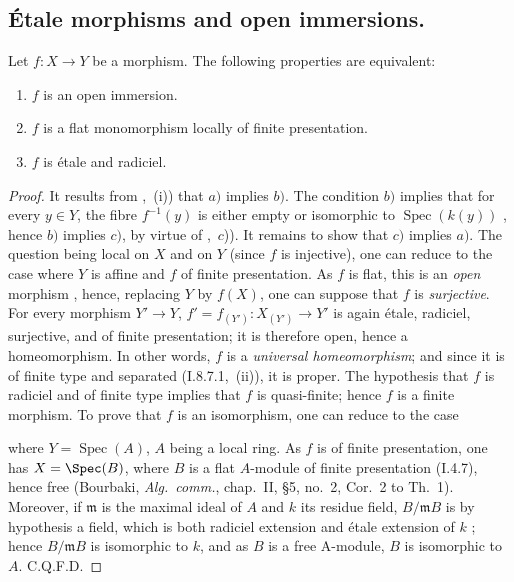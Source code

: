 \subsection{\'Etale morphisms and open immersions.}
\label{subsection:IV.17.9}
\label{IV.17.9}

\begin{theorem}[17.9.1]
\label{IV.17.9.1}
Let $f:X\to Y$ be a morphism.
The following properties are equivalent:
\begin{enumerate}
  \item[a)] $f$ is an open immersion.
  \item[b)] $f$ is a flat monomorphism locally of finite presentation.
  \item[c)] $f$ is \'etale and radiciel.
\end{enumerate}
\end{theorem}

\begin{proof}
It results from ,~(i)) that $a)$ implies $b)$.
The condition $b)$ implies that for every $y\in Y$, the fibre $f^{-1}(y)$ is either empty or isomorphic to $\operatorname{Spec}(k(y))$ , hence $b)$ implies $c)$, by virtue of ,~$c$)).
It remains to show that $c)$ implies $a)$.
The question being local on $X$ and on $Y$ (since $f$ is injective), one can reduce to the case where $Y$ is affine and $f$ of finite presentation.
As $f$ is flat, this is an \emph{open} morphism , hence, replacing $Y$ by $f(X)$, one can suppose that $f$ is \emph{surjective}.
For every morphism $Y'\to Y$, $f'=f_{(Y')}:X_{(Y')}\to Y'$ is again \'etale, radiciel, surjective, and of finite presentation; it is therefore open, hence a homeomorphism.
In other words, $f$ is a \emph{universal homeomorphism}; and since it is of finite type and separated (I.8.7.1,~(ii)), it is proper.
The hypothesis that $f$ is radiciel and of finite type implies that $f$ is quasi-finite; hence  $f$ is a finite morphism.
To prove that $f$ is an isomorphism, one can reduce to the case


where $Y=\operatorname{Spec}(A)$, $A$ being a local ring.
As $f$ is of finite presentation, one has $X=\Spec(B)$, where $B$ is a flat $A$-module of finite presentation (I.4.7), hence free (Bourbaki, \emph{Alg.~comm.}, chap.~II, \S5, no.~2, Cor.~2 to Th.~1).
Moreover, if $\mathfrak{m}$ is the maximal ideal of $A$ and $k$ its residue field, $B/\mathfrak{m}B$ is by hypothesis a field, which is both radiciel extension and \'etale extension of $k$ ; hence $B/\mathfrak{m}B$ is isomorphic to $k$, and as $B$ is a free A-module, $B$ is isomorphic to $A$.
C.Q.F.D.
\end{proof}

